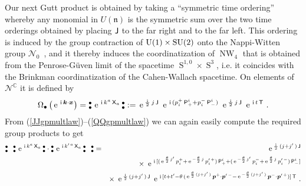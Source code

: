 \documentclass[11pt,a4paper]{article}
\DeclareMathOperator{\Sphere}{S}
\DeclareMathOperator{\NW}{NW}
\let\S\Sphere
\newcommand{\NOb}{\mbox{$\substack{\bullet\\\bullet}$}} %
\newcommand{\1}{\mathbb{1}}
\newcommand{\mbf}[1]{{\boldsymbol {#1} }}
\def\ii{{\,{\rm i}\,}}
\def\P{{\sf P}}
\def\T{{\sf T}}
\def\X{{\sf X}}
\def\J{{\sf J}}
\def\mx{{\mbf x}}
\def\mk{{\mbf k}}
\def\mbp{{\mbf p}}
\def\mfn{{\mathfrak n}}
\newcommand{\complex}{{\mathbb C}} %
\def\e{{\,\rm e}\,}
\def\bea{\begin{eqnarray}}
\def\eea{\end{eqnarray}}
\newcommand{\beq}{\begin{eqnarray}}
\newcommand{\eeq}{\end{eqnarray}}
\begin{document}
Our next Gutt product is obtained by taking a ``symmetric time
ordering'' whereby any monomial in $U(\mfn)$ is the symmetric sum
over the two time orderings obtained by placing $\J$ to the far right
and to the far left. This ordering is induced by the group contraction of
${\rm U}(1)\times{\rm SU}(2)$ onto the Nappi-Witten group
$\mathcal{N}_0$~\cite{DAK2}, and it thereby induces the
coordinatization of $\NW_4$ that is obtained from the
Penrose-G\"uven limit of the spacetime $\S^{1,0}\times\S^3$, i.e. it
coincides with the Brinkman coordinatization of the Cahen-Wallach
spacetime. On elements of $\mathcal{N}^\complex$ it is defined by
\beq
\Omega_\bullet\left(\e^{\ii\mk\cdot\mx}\right)=
\NOb\,\e^{\ii k^a\,\X_a}\,\NOb:=\e^{\frac\ii2\,j\,\J}~
\e^{\ii(p_i^+\,\P^i_+
+p_i^-\,\P^i_-)}~\e^{\frac\ii2\,j\,\J}~\e^{\ii t\,\T} \ .
\label{TOsymgpprods}\eeq
{}From (\ref{JJgpmultlaw})--(\ref{QQgpmultlaw}) we can again easily
compute the required group products to get
\bea
\NOb~~\NOb\,\e^{\ii k^a\,\X_a}\,\NOb\cdot\NOb\,\e^{\ii k^{\prime\,a}\,\X_a}
\,\NOb~~\NOb&=&\e^{\frac\ii2\,(j+j'\,)\,\J}\nonumber\\ &&\times~
\e^{\ii[(\e^{\frac{\theta}2\,j'}\,p_i^++
\e^{-\frac{\theta}2\,j}\,p_i^{\prime\,+})\,
\P^i_++(\e^{-\frac{\theta}2\,j'}\,p_i^-+
\e^{\frac{\theta}2\,j}\,p_i^{\prime\,-})\,\P^i_-]}
\nonumber\\ &&\times~\e^{\frac\ii2\,(j+j'\,)\,\J}~
\e^{\ii[t+t'-\theta\,(\e^{\frac{\theta}2\,(j+j'\,)}\,
\mbp^+\cdot\mbp^{\prime\,-}-\e^{-\frac{\theta}2\,(j+j'\,)}\,
\mbp^-\cdot\mbp^{\prime\,+})]\,\T} \ . \nonumber\\ &&
\label{TOsymgpprodexpl}\eea
\end{document}
